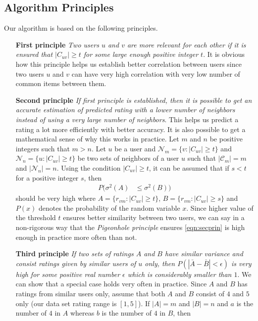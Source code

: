 \documentclass[manuscript,screen,review]{acmart}
\begin{document}
	\subsection{Algorithm Principles}
	Our algorithm is based on the following principles.
	\begin{enumerate}
		\item[\bfseries First principle] \textit{Two users $u$ and $v$ are more relevant for each other if it is ensured that $|C_{uv}|\geq t$ for some large enough positive integer $t$}. It is obvious how this principle helps us establish better correlation between users since two users $u$ and $v$ can have very high correlation with very low number of common items between them.
		\item[\bfseries Second principle] \textit{If first principle is established, then it is possible to get an accurate estimation of predicted rating with a lower number of neighbors instead of using a very large number of neighbors}. This helps us predict a rating a lot more efficiently with better accuracy. It is also possible to get a mathematical sense of why this works in practice. Let $m$ and $n$ be positive integers such that $m>n$. Let $u$ be a user and $\mathcal{N}_{m}=\{v:|C_{uv}|\geq t\}$ and $\mathcal{N}_{n}=\{u:|C_{uv}|\geq t\}$ be two sets of neighbors of a user $u$ such that $|\mathcal{C}_{m}|=m$ and $|\mathcal{N}_{n}|=n$. Using the condition $|C_{uv}|\geq t$, it can be assumed that if $s<t$ for a positive integer $s$, then
		\begin{align}
			P(\sigma^{2}(A)
			& \leq \sigma^{2}(B))\label{eqn:secprin}
		\end{align}
		should be very high where $A=\{r_{vm}:|C_{uv}|\geq t\}$, $B=\{r_{vm}:|C_{uv}|\geq s\}$ and $P(x)$ denotes the probability of the random variable $x$. Since higher value of the threshold $t$ ensures better similarity between two users, we can say in a non-rigorous way that the \textit{Pigeonhole principle} ensures \eqref{eqn:secprin} is high enough in practice more often than not.
		\item[\bfseries Third principle] \textit{If two sets of ratings $A$ and $B$ have similar variance and consist ratings given by similar users of $u$ only, then $P(|\bar{A}-\bar{B}|<\epsilon)$ is very high for some positive real number $\epsilon$ which is considerably smaller than $1$}. We can show that a special case holds very often in practice. Since $A$ and $B$ has ratings from similar users only, assume that both $A$ and $B$ consist of $4$ and $5$ only (our data set rating range is $[1,5]$). If $|A|=m$ and $|B|=n$ and $a$ is the number of $4$ in $A$ whereas $b$ is the number of $4$ in $B$, then

\end{enumerate}
\end{document}
